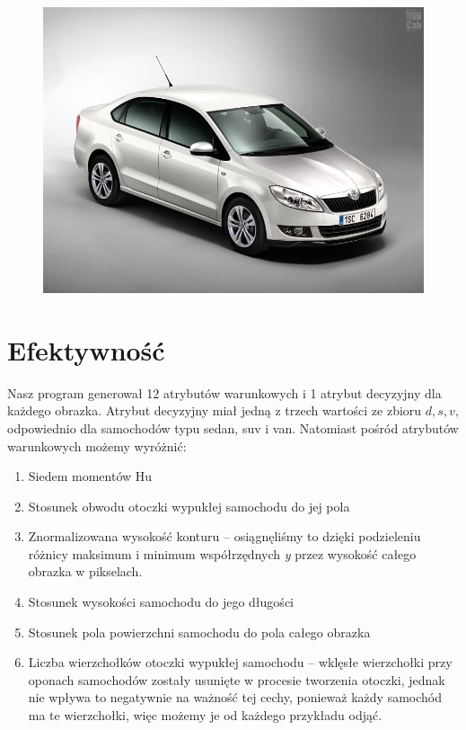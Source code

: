 \documentclass{article}
\begin{document}
\begin{figure}[H]
\begin{center}
\includegraphics[width=1\textwidth]{../imgs_easy/sedan_22.jpg}
\end{center}
\label{fig: wykres3}
\end{figure}
\section{Efektywność}
Nasz program generował 12 atrybutów warunkowych i 1 atrybut decyzyjny dla każdego obrazka. Atrybut decyzyjny miał jedną z trzech wartości ze zbioru ${d, s, v}$, odpowiednio dla samochodów typu sedan, suv i van. Natomiast pośród atrybutów warunkowych możemy wyróżnić:
\begin{enumerate}
\item Siedem momentów Hu
\item Stosunek obwodu otoczki wypukłej samochodu do jej pola
\item Znormalizowana wysokość konturu -- osiągnęliśmy to dzięki podzieleniu różnicy maksimum i minimum współrzędnych \textit{y} przez wysokość całego obrazka w pikselach.
\item Stosunek wysokości samochodu do jego długości
\item Stosunek pola powierzchni samochodu do pola całego obrazka
\item Liczba wierzchołków otoczki wypukłej samochodu -- wklęsłe wierzchołki przy oponach samochodów zostały usunięte w procesie tworzenia otoczki, jednak nie wpływa to negatywnie na ważność tej cechy, ponieważ każdy samochód ma te wierzchołki, więc możemy je od każdego przykładu odjąć.
\end{enumerate}
\end{document}
